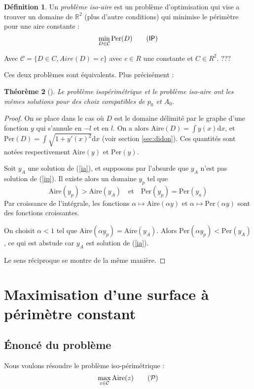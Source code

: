 \documentclass[10pt,a4paper]{article}
\newcommand{\R}{\mathbb{R}}
\newcommand{\C}{\mathcal{C}}
\renewcommand{\d}{\mathrm{d}}
\renewcommand{\P}{\mathcal{P}}
\newcommand{\A}{\mathrm{Aire}}
\newcommand{\p}{\mathrm{Per}}
\newcommand{\IP}{\textsf{IP}}
\theoremstyle{plain}
\newtheorem{thm}{Théorème}[section]
\theoremstyle{definition}
\newtheorem{defi}[thm]{Définition}
\begin{document}
\begin{defi}
Un \emph{problème iso-aire} est un problème d'optimisation qui vise a trouver un domaine de $\R^2$ (plus d'autre conditions) qui minimise le périmètre pour une aire constante :
\[\min_{D \in \C} \p(D) \label{ip}\tag{\IP}\]

Avec $\mathcal{C} = \{ D \in C, Aire(D)=c \}$ avec $c \in R$ une constante et $C \in R^2$. ???
\end{defi}


Ces deux problèmes sont équivalents. Plus précisément :

\begin{thm}[\cite{tapia09}]
Le problème isopérimétrique et le problème iso-aire ont les mêmes solutions pour des choix compatibles de $p_0$ et $A_0$.
\end{thm}


\begin{proof}
On se place dans le cas où $D$ est le domaine délimité par le graphe d'une fonction $y$ qui s'annule en $-l$ et en $l$. On a alors $\A(D)=\int y(x)\d x$, et $\p(D)=\int\sqrt{1+y'(x)^2}\d x$ (voir section \ref{sec:didon}). Ces quantités sont notées respectivement $\A(y)$ et $\p(y)$.

Soit $y_A$ une solution de (\ref{ia}), et supposons par l'absurde que $y_A$ n'est pas solution de (\ref{ip}). Il existe alors un domaine $y_p$ tel que \[\A(y_p)>\A(y_A)\quad\text{et}\quad \p(y_p)=\p(y_a)\]
Par croissance de l'intégrale, les fonctions $\alpha\mapsto\A(\alpha y)$ et $\alpha\mapsto\p(\alpha y)$ sont des fonctions croissantes.

On choisit $\alpha<1$ tel que $\A(\alpha y_p)=\A(y_A)$. Alors $\p(\alpha y_p)<\p(y_A)$, ce qui est abstude car $y_A$ est solution de (\ref{ia}).

Le sens réciproque se montre de la même manière.
\end{proof}


\section{Maximisation d'une surface à périmètre constant}

\subsection{Énoncé du problème}

Nous voulons résoudre le problème iso-périmétrique :
\[\max_{z \in \mathcal{C}} \A(z) \label{eq:p}\tag{$\P$}\]
\end{document}
